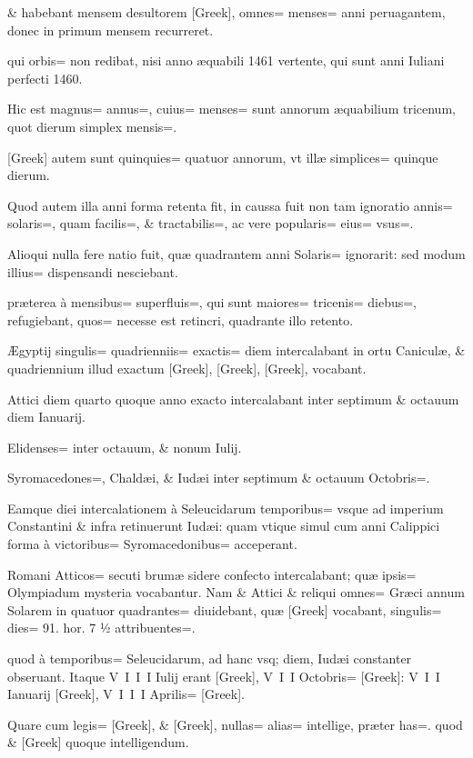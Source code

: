 \begin{parnumbers}

\& habebant mensem desultorem  [Greek], omnes= menses= anni peruagantem, donec in primum mensem recurreret.

qui orbis= non redibat, nisi anno æquabili 1461 vertente, qui sunt anni Iuliani perfecti 1460.

Hic est magnus= annus=, cuius= menses= sunt annorum æquabilium tricenum, quot dierum simplex mensis=.

[Greek] autem sunt quinquies= quatuor annorum, vt illæ simplices= quinque dierum.

Quod autem illa anni forma retenta fit, in caussa fuit non tam ignoratio annis= solaris=, quam facilis=, \& tractabilis=, ac vere popularis= eius= vsus=.

Alioqui nulla fere natio fuit, quæ quadrantem anni Solaris= ignorarit: sed modum illius= dispensandi nesciebant.

præterea à mensibus= superfluis=, qui sunt maiores= tricenis= diebus=, refugiebant, quos= necesse est retincri, quadrante illo retento. 

Ægyptij singulis= quadrienniis= exactis= diem intercalabant in ortu Caniculæ, \& quadriennium illud exactum [Greek], [Greek], [Greek], vocabant.

Attici diem quarto quoque anno exacto intercalabant inter septimum \& octauum diem Ianuarij.

Elidenses= inter octauum, \& nonum Iulij.

Syromacedones=, Chaldæi, \& Iudæi inter septimum \& octauum Octobris=.

Eamque diei intercalationem à Seleucidarum temporibus= vsque ad imperium Constantini \& infra retinuerunt Iudæi: quam vtique simul cum anni Calippici forma à victoribus= Syromacedonibus= acceperant.

Romani Atticos= secuti brumæ sidere confecto intercalabant; quæ ipsis= Olympiadum mysteria vocabantur. Nam \& Attici \& reliqui omnes= Græci annum Solarem in  quatuor quadrantes= diuidebant, quæ [Greek] vocabant, singulis= dies= 91. hor. 7 ½ attribuentes=.

quod à temporibus= Seleucidarum, ad hanc vsq; diem, Iudæi constanter obseruant. Itaque V I I I Iulij erant [Greek], V I I Octobris= [Greek]: V I I Ianuarij [Greek], V I I I Aprilis= [Greek].

Quare cum legis= [Greek], \& [Greek], nullas= alias= intellige, præter has=. quod \& [Greek] quoque intelligendum.


\end{parnumbers}
